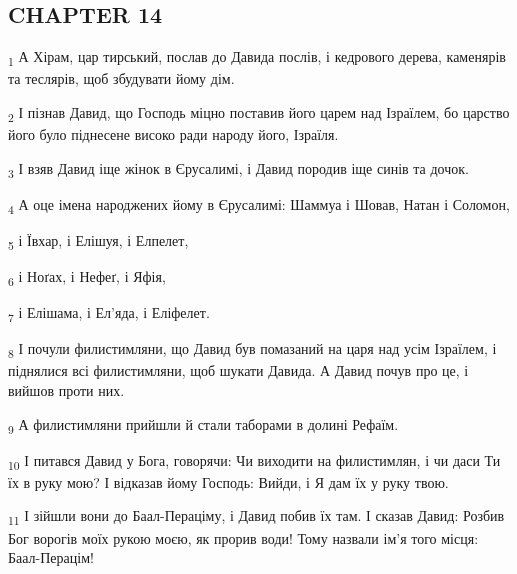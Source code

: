 \subsection{CHAPTER 14}
\begin{tcolorbox}
\textsubscript{1} А Хірам, цар тирський, послав до Давида послів, і кедрового дерева, каменярів та теслярів, щоб збудувати йому дім.
\end{tcolorbox}
\begin{tcolorbox}
\textsubscript{2} І пізнав Давид, що Господь міцно поставив його царем над Ізраїлем, бо царство його було піднесене високо ради народу його, Ізраїля.
\end{tcolorbox}
\begin{tcolorbox}
\textsubscript{3} І взяв Давид іще жінок в Єрусалимі, і Давид породив іще синів та дочок.
\end{tcolorbox}
\begin{tcolorbox}
\textsubscript{4} А оце імена народжених йому в Єрусалимі: Шаммуа і Шовав, Натан і Соломон,
\end{tcolorbox}
\begin{tcolorbox}
\textsubscript{5} і Ївхар, і Елішуя, і Елпелет,
\end{tcolorbox}
\begin{tcolorbox}
\textsubscript{6} і Ноґах, і Нефеґ, і Яфія,
\end{tcolorbox}
\begin{tcolorbox}
\textsubscript{7} і Елішама, і Ел'яда, і Еліфелет.
\end{tcolorbox}
\begin{tcolorbox}
\textsubscript{8} І почули филистимляни, що Давид був помазаний на царя над усім Ізраїлем, і піднялися всі филистимляни, щоб шукати Давида. А Давид почув про це, і вийшов проти них.
\end{tcolorbox}
\begin{tcolorbox}
\textsubscript{9} А филистимляни прийшли й стали таборами в долині Рефаїм.
\end{tcolorbox}
\begin{tcolorbox}
\textsubscript{10} І питався Давид у Бога, говорячи: Чи виходити на филистимлян, і чи даси Ти їх в руку мою? І відказав йому Господь: Вийди, і Я дам їх у руку твою.
\end{tcolorbox}
\begin{tcolorbox}
\textsubscript{11} І зійшли вони до Баал-Пераціму, і Давид побив їх там. І сказав Давид: Розбив Бог ворогів моїх рукою моєю, як прорив води! Тому назвали ім'я того місця: Баал-Перацім!
\end{tcolorbox}
